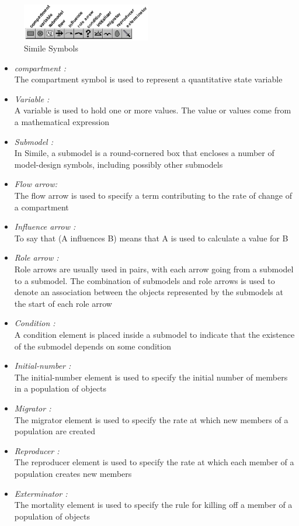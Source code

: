 \begin{figure}[htbp]
\centering
\includegraphics[width=0.5\textwidth]{pics/Simile_symbols.png}
\caption{Simile Symbols}
\label{fig:Simile Symbols}	
\end{figure}

\begin{itemize}
	\item \emph{compartment :}\\
The compartment symbol is used to represent a quantitative state variable
	\item \emph{Variable :}\\
A variable is used to hold one or more values. The value or values come from a mathematical expression
	\item \emph{Submodel :}\\
In Simile, a submodel is a round-cornered box that encloses a number of model-design symbols, including possibly other submodels
	\item \emph{Flow arrow:}\\
The flow arrow is used to specify a term contributing to the rate of change of a compartment
	\item \emph{Influence arrow :}\\
To say that (A influences B) means that A is used to calculate a value for B
	\item \emph{Role arrow :}\\
Role arrows are usually used in pairs, with each arrow going from a submodel to a submodel. The combination of submodels and role arrows is used to denote an association between the objects represented by the submodels at the start of each role arrow
	\item \emph{Condition :}\\
A condition element is placed inside a submodel to indicate that the existence of the submodel depends on some condition
	\item \emph{Initial-number :}\\
The initial-number element is used to specify the initial number of members in a population of objects
	\item \emph{Migrator :}\\
The migrator element is used to specify the rate at which new members of a population are created
	\item \emph{Reproducer :}\\
The reproducer element is used to specify the rate at which each member of a population creates new members
\item \emph{Exterminator :}\\
The mortality element is used to specify the rule for killing off a member of a population of objects
\end{itemize}	

